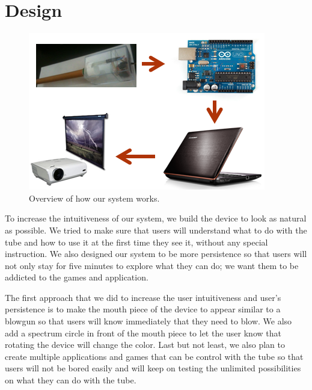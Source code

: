 \section{Design}\label{sec:design}

\begin{figure}
  \centering
  \includegraphics[width=0.8\linewidth]{./figs/sketch.png}
  \caption{Overview of how our system works.}
  \label{fig:design-sketch}
\end{figure}

To increase the intuitiveness of our system, we build the device to look as natural as possible. We tried to make sure that users will understand what to do with the tube and how to use it at the first time they see it, without any special instruction. We also designed our system to be more persistence so that users will not only stay for five minutes to explore what they can do; we want them to be addicted to the games and application.

The first approach that we did to increase the user intuitiveness and user’s persistence is to make the mouth piece of the device to appear similar to a blowgun so that users will know immediately that they need to blow. We also add a spectrum circle in front of the mouth piece to let the user know that rotating the device will change the color. Last but not least, we also plan to create multiple applications and games that can be control with the tube so that users will not be bored easily and will keep on testing the unlimited possibilities on what they can do with the tube.


